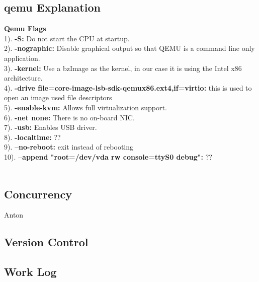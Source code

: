 \documentclass[letterpaper,10pt]{article}
\begin{document}
\subsection{qemu Explanation}
{\bfseries Qemu Flags}\\
1). {\textbf{-S:}} Do not start the CPU at startup.\\
2). {\textbf{-nographic:}} Disable graphical output so that QEMU is a command line only application.\\
3). {\textbf{-kernel:}} Use a bzImage as the kernel, in our case it is using the Intel x86 architecture.\\
4). {\textbf{-drive file=core-image-lsb-sdk-qemux86.ext4,if=virtio:}} this is used to open an image used file descriptors\\
5). {\textbf{-enable-kvm:}} Allows full virtualization support.\\
6). {\textbf{-net none:}} There is no on-board NIC.\\
7). {\textbf{-usb:}} Enables USB driver.\\
8). {\textbf{-localtime:}} ??\\
9). {\textbf{--no-reboot:}} exit instead of rebooting\\
10). {\textbf{--append "root=/dev/vda rw console=ttyS0 debug":}} ??\\\\
\subsection{Concurrency}
Anton

\subsection{Version Control}

\subsection{Work Log}
\end{document}
